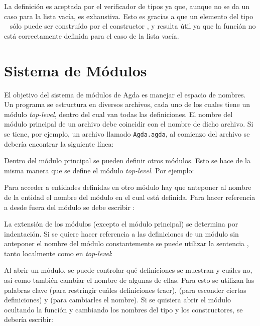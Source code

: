 
La definición es aceptada por el verificador de tipos ya que, aunque no se da un caso para la lista vacía, es exhaustiva. Esto es gracias a que un elemento del tipo \mbox{  \AgdaSymbol{(} \AgdaSymbol{)}} sólo puede ser construído por el constructor \AgdaFunction{\_::\_}, y resulta útil ya que la función  no está correctamente definida para el caso de la lista vacía.  

\section{Sistema de Módulos}

El objetivo del sistema de módulos de Agda es manejar el espacio de nombres. Un programa se estructura en diversos archivos, cada uno de los cuales tiene un módulo \textit{top-level}, dentro del cual van todas las definiciones. El nombre del módulo principal de un archivo debe coincidir con el nombre de dicho archivo. Si se tiene, por ejemplo, un archivo llamado \texttt{Agda.agda}, al comienzo del archivo se debería encontrar la siguiente línea:


Dentro del módulo principal se pueden definir otros módulos. Esto se hace de la misma manera que se define el módulo \textit{top-level}. Por ejemplo:


Para acceder a entidades definidas en otro módulo hay que anteponer al nombre de la entidad el nombre del módulo en el cual está definida. Para hacer referencia a  desde fuera del módulo  se debe escribir :




La extensión de los módulos (excepto el módulo principal) se determina por indentación. Si se quiere hacer referencia a las definiciones de un módulo sin anteponer el nombre del módulo constantemente se puede utilizar la sentencia , tanto localmente como en \textit{top-level}:






Al abrir un módulo, se puede controlar qué definiciones se muestran y cuáles no, así como también cambiar el nombre de algunas de ellas. Para esto se utilizan las palabras clave  (para restringir cuáles definiciones traer),  (para esconder ciertas definiciones) y  (para cambiarles el nombre). Si se quisiera abrir el módulo  ocultando la función  y cambiando los nombres del tipo y los constructores, se debería escribir:

